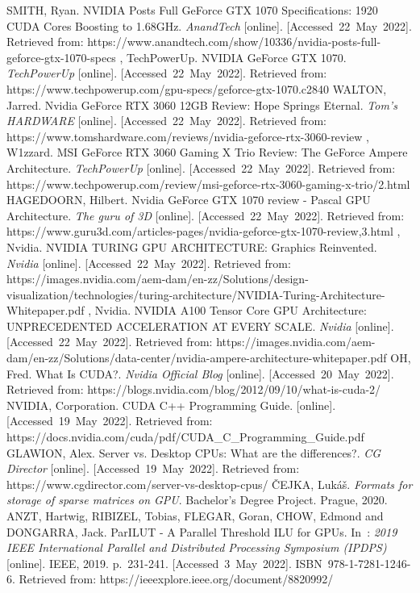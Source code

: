 \begin{thebibliography}{45}
	SMITH, Ryan. NVIDIA Posts Full GeForce GTX 1070 Specifications: 1920 CUDA Cores Boosting to 1.68GHz. \textit{AnandTech} [online]. [Accessed 22 May 2022]. Retrieved from: https://www.anandtech.com/show/10336/nvidia-posts-full-geforce-gtx-1070-specs
	, TechPowerUp. NVIDIA GeForce GTX 1070. \textit{TechPowerUp} [online]. [Accessed 22 May 2022]. Retrieved from: https://www.techpowerup.com/gpu-specs/geforce-gtx-1070.c2840
	WALTON, Jarred. Nvidia GeForce RTX 3060 12GB Review: Hope Springs Eternal. \textit{Tom's HARDWARE} [online]. [Accessed 22 May 2022]. Retrieved from: https://www.tomshardware.com/reviews/nvidia-geforce-rtx-3060-review
	, W1zzard. MSI GeForce RTX 3060 Gaming X Trio Review: The GeForce Ampere Architecture. \textit{TechPowerUp} [online]. [Accessed 22 May 2022]. Retrieved from: https://www.techpowerup.com/review/msi-geforce-rtx-3060-gaming-x-trio/2.html
	HAGEDOORN, Hilbert. Nvidia GeForce GTX 1070 review - Pascal GPU Architecture. \textit{The guru of 3D} [online]. [Accessed 22 May 2022]. Retrieved from: https://www.guru3d.com/articles-pages/nvidia-geforce-gtx-1070-review,3.html
	, Nvidia. NVIDIA TURING GPU ARCHITECTURE: Graphics Reinvented. \textit{Nvidia} [online]. [Accessed 22 May 2022]. Retrieved from: https://images.nvidia.com/aem-dam/en-zz/Solutions/design-visualization/technologies/turing-architecture/NVIDIA-Turing-Architecture-Whitepaper.pdf
	, Nvidia. NVIDIA A100 Tensor Core GPU Architecture: UNPRECEDENTED ACCELERATION AT EVERY SCALE. \textit{Nvidia} [online]. [Accessed 22 May 2022]. Retrieved from: https://images.nvidia.com/aem-dam/en-zz/Solutions/data-center/nvidia-ampere-architecture-whitepaper.pdf
	OH, Fred. What Is CUDA?. \textit{Nvidia Official Blog} [online]. [Accessed 20 May 2022]. Retrieved from: https://blogs.nvidia.com/blog/2012/09/10/what-is-cuda-2/
	NVIDIA, Corporation. CUDA C++ Programming Guide. [online]. [Accessed 19 May 2022]. Retrieved from: https://docs.nvidia.com/cuda/pdf/CUDA\_C\_Programming\_Guide.pdf
	GLAWION, Alex. Server vs. Desktop CPUs: What are the differences?. \textit{CG Director} [online]. [Accessed 19 May 2022]. Retrieved from: https://www.cgdirector.com/server-vs-desktop-cpus/
	ČEJKA, Lukáš. \textit{Formats for storage of sparse matrices on GPU}. Bachelor's Degree Project. Prague, 2020.
	ANZT, Hartwig, RIBIZEL, Tobias, FLEGAR, Goran, CHOW, Edmond and DONGARRA, Jack. ParILUT - A Parallel Threshold ILU for GPUs. In : \textit{2019 IEEE International Parallel and Distributed Processing Symposium (IPDPS)} [online]. IEEE, 2019. p. 231-241. [Accessed 3 May 2022]. ISBN 978-1-7281-1246-6. Retrieved from: https://ieeexplore.ieee.org/document/8820992/

\end{thebibliography}
